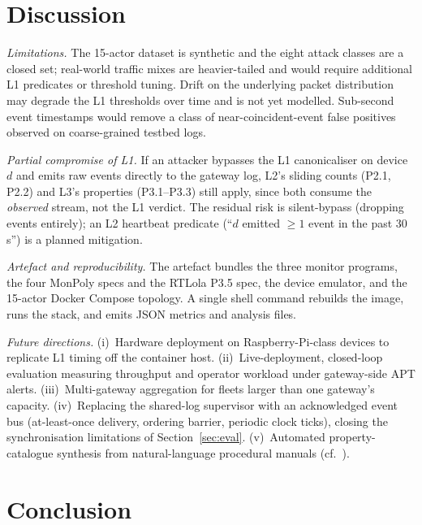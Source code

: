 \documentclass[runningheads]{llncs}
\begin{document}
\section{Discussion}
\label{sec:discussion}

\emph{Limitations.}  The 15-actor dataset is synthetic and
the eight attack classes are a closed set; real-world traffic
mixes are heavier-tailed and would require additional L1
predicates or threshold tuning.  Drift on the
underlying packet distribution may degrade the L1 thresholds over
time and is not yet modelled.  Sub-second event timestamps would
remove a class of near-coincident-event false positives observed
on coarse-grained testbed logs.

\emph{Partial compromise of L1.}
If an attacker bypasses the L1 canonicaliser on device $d$ and
emits raw events directly to the gateway log, L2's sliding counts
(P2.1, P2.2) and L3's properties (P3.1--P3.3) still apply, since
both consume the \emph{observed} stream, not the L1
verdict.  The residual risk is silent-bypass (dropping events
entirely); an L2 heartbeat predicate (``$d$ emitted
$\geq\!1$ event in the past 30\,s'') is a planned mitigation.

\emph{Artefact and reproducibility.}
The artefact bundles the three monitor programs, the four MonPoly
specs and the RTLola P3.5 spec, the device emulator, and the 15-actor
Docker Compose topology.  A single shell command rebuilds the image,
runs the stack, and emits JSON metrics and analysis files.

\emph{Future directions.}
(i)~Hardware deployment on Raspberry-Pi-class devices to
replicate L1 timing off the container host.
(ii)~Live-deployment, closed-loop evaluation measuring
throughput and operator workload under gateway-side APT alerts.
(iii)~Multi-gateway aggregation for fleets larger than one
gateway's capacity.
(iv)~Replacing the shared-log supervisor with an acknowledged event bus (at-least-once delivery, ordering barrier, periodic clock ticks), closing the
synchronisation limitations of Section~\ref{sec:eval}.
(v)~Automated property-catalogue synthesis from natural-language
procedural manuals (cf.\ \cite{mantra2026}).



\section{Conclusion}
\label{sec:conclusion}
\end{document}
